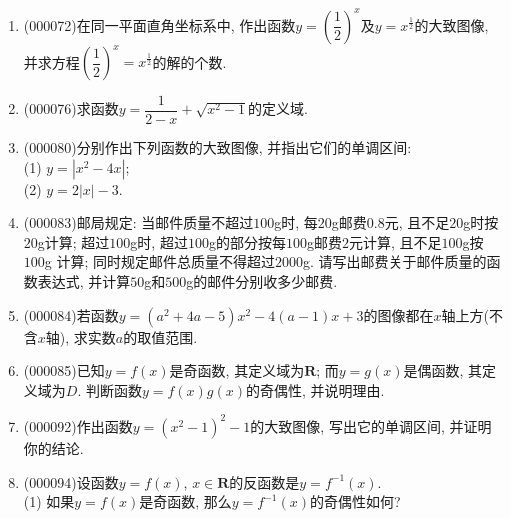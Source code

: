 \documentclass[10pt,a4paper]{article}
\begin{document}
\begin{enumerate}[1.]
{}{
}{
}
\item {\tiny (000072)}在同一平面直角坐标系中, 作出函数$y=(\dfrac 12)^x$及$y=x^{\frac 12}$的大致图像, 并求方程$(\dfrac 12)^x=x^{\frac 12}$的解的个数.
\item {\tiny (000076)}求函数$y=\dfrac1{2-x}+\sqrt{x^2-1}$的定义域.
\item {\tiny (000080)}分别作出下列函数的大致图像, 并指出它们的单调区间:\\
(1) $y=|x^2-4x|$;\\
(2) $y=2|x|-3$.
\item {\tiny (000083)}邮局规定: 当邮件质量不超过$100$g时, 每$20$g邮费$0.8$元, 且不足$20$g时按$20$g计算; 超过$100$g时, 超过$100$g的部分按每$100$g邮费$2$元计算, 且不足$100$g按$100$g
计算; 同时规定邮件总质量不得超过$2000$g. 请写出邮费关于邮件质量的函数表达式, 并计算$50$g和$500$g的邮件分别收多少邮费.
\item {\tiny (000084)}若函数$y=(a^2+4a-5)x^2-4(a-1)x+3$的图像都在$x$轴上方(不含$x$轴), 求实数$a$的取值范围.
\item {\tiny (000085)}已知$y=f(x)$是奇函数, 其定义域为$\mathbf{R}$; 而$y=g(x)$是偶函数, 其定义域为$D$. 判断函数$y=f(x)g(x)$的奇偶性, 并说明理由.
\item {\tiny (000092)}作出函数$y=(x^2-1)^2-1$的大致图像, 写出它的单调区间, 并证明你的结论.
\item {\tiny (000094)}设函数$y=f(x)$, $x\in \mathbf{R}$的反函数是$y=f^{-1}(x)$.\\
(1) 如果$y=f(x)$是奇函数, 那么$y=f^{-1}(x)$的奇偶性如何?\\

\end{enumerate}
\end{document}
